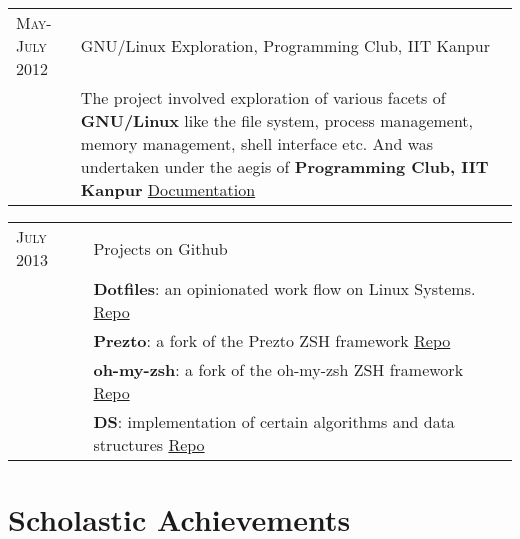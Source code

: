 \documentclass[a4paper,10pt]{article} %
\begin{document}
\begin{tabular}{p{2.2cm}|p{11cm}}
    \textsc{May-July 2012} & GNU/Linux Exploration, Programming Club, IIT Kanpur\\
                           & \footnotesize{ The project involved exploration of various facets of
                             \textbf{GNU/Linux} like the file system, process management,
                             memory management, shell interface etc. And was
                             undertaken under the aegis of \textbf{Programming Club, IIT Kanpur}
                             \href{https://docs.google.com/document/d/1ZHO9w36aoq3oaZBR4Um1AOmDfiTDAEgM6baQAu3icw4/edit?usp=sharing} 
                             {Documentation} } \\
\end{tabular}

\begin{tabular}{p{2.2cm}|p{11cm}}
    \textsc{July 2013} & Projects on Github \\
                       & \footnotesize{\textbf{Dotfiles}: an opinionated work flow on Linux Systems.
                          \href{https://github.com/srijanshetty/dotfiles} {Repo} } \\
                       & \footnotesize{\textbf{Prezto}: a fork of the Prezto ZSH framework
                          \href{https://github.com/srijanshetty/prezto} {Repo}} \\
                       & \footnotesize {\textbf{oh-my-zsh}: a fork of the oh-my-zsh ZSH framework
                          \href{https://github.com/srijanshetty/oh-my-zsh} {Repo} } \\
                       & \footnotesize{\textbf{DS}: implementation of certain algorithms and data structures
                          \href{https://github.com/srijanshetty/DS} {Repo}} \\
\end{tabular}

\section{Scholastic Achievements}
\end{document}

